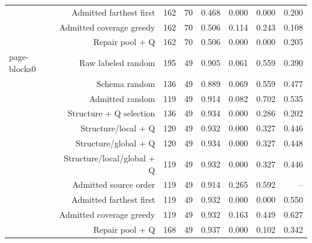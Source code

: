 \begin{longtable}{lrrrrrrr}
 & Admitted farthest first & 162 & 70 & 0.468 & 0.000 & 0.000 & 0.200 \\
 & Admitted coverage greedy & 162 & 70 & 0.506 & 0.114 & 0.243 & 0.108 \\
 & Repair pool + Q & 162 & 70 & 0.506 & 0.000 & 0.000 & 0.205 \\
page-blocks0 & Raw labeled random & 195 & 49 & 0.905 & 0.061 & 0.559 & 0.390 \\
 & Schema random & 136 & 49 & 0.889 & 0.069 & 0.559 & 0.477 \\
 & Admitted random & 119 & 49 & 0.914 & 0.082 & 0.702 & 0.535 \\
 & Structure + Q selection & 136 & 49 & 0.934 & 0.000 & 0.286 & 0.202 \\
 & Structure/local + Q & 120 & 49 & 0.932 & 0.000 & 0.327 & 0.446 \\
 & Structure/global + Q & 120 & 49 & 0.934 & 0.000 & 0.327 & 0.448 \\
 & Structure/local/global + Q & 119 & 49 & 0.932 & 0.000 & 0.327 & 0.446 \\
 & Admitted source order & 119 & 49 & 0.914 & 0.265 & 0.592 & -- \\
 & Admitted farthest first & 119 & 49 & 0.932 & 0.000 & 0.000 & 0.550 \\
 & Admitted coverage greedy & 119 & 49 & 0.932 & 0.163 & 0.449 & 0.627 \\
 & Repair pool + Q & 168 & 49 & 0.937 & 0.000 & 0.102 & 0.342 \\
\bottomrule\end{longtable}
